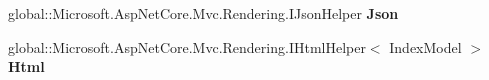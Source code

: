 \begin{DoxyCompactItemize}
global\+::\+Microsoft.\+Asp\+Net\+Core.\+Mvc.\+Rendering.\+I\+Json\+Helper {\bfseries Json}
\item 
\mbox{\label{class_projeto_e_s_w_1_1_areas_1_1_identity_1_1_pages_1_1_account_1_1_manage_1_1_areas___identity605f2cac3dc5a4ea38af9197eadd5652_a823096f20e3650d548f5b243fb8624d4}} 
global\+::\+Microsoft.\+Asp\+Net\+Core.\+Mvc.\+Rendering.\+I\+Html\+Helper$<$ Index\+Model $>$ {\bfseries Html}
\end{DoxyCompactItemize}

